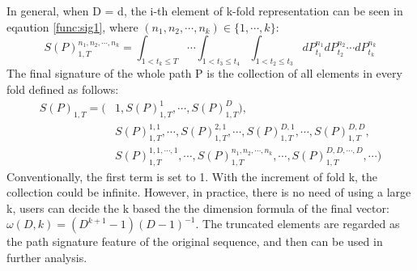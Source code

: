 In general, when D = d, the i-th element of k-fold representation can be seen in eqaution \ref{func:sig1}, where $(n_1,n_2, \cdots, n_k) \in \{1, \cdots, k\}$:
\begin{equation}
    \label{func:sig1}
    S(P)_{1,T}^{n_1,n_2,\cdots, n_k} = \int_{1 < t_k \le T} \cdots \int_{1 < t_3 \le t_4} \int_{1 < t_2 \le t_3}dP_{t_1}^{n_1}dP_{t_2}^{n_2} \cdots dP_{t_k}^{n_k}
\end{equation}
The final signature of the whole path P is the collection of all elements in every fold defined as follows:
\begin{equation}
    \begin{aligned}
        S(P)_{1,T} = (& 1, S(P)_{1,T}^1, \cdots, S(P)_{1,T}^D), \\
        & S(P)_{1,T}^{1,1}, \cdots, S(P)_{1,T}^{2,1}, \cdots, S(P)_{1,T}^{D,1}, \cdots, S(P)_{1,T}^{D,D}, \\
        & S(P)_{1,T}^{1, 1,\cdots, 1}, \cdots, S(P)_{1,T}^{n_1, n_2,\cdots, n_k}, \cdots, S(P)_{1,T}^{D,D,\cdots,D}, \cdots)
    \end{aligned}
\end{equation}
Conventionally, the first term is set to 1. With the increment of fold k, the collection could be infinite. However, in practice, there is no need of using a large k, users can decide the k based the the dimension formula of the final vector: $\omega(D,k) = (D^{k+1} - 1) (D-1)^{-1} $. The truncated elements are regarded as the path signature feature of the original sequence, and then can be used in further analysis.



